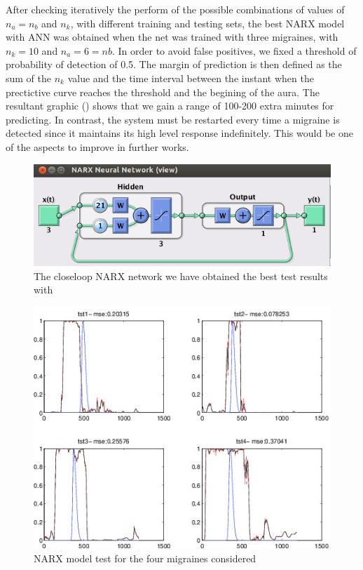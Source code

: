 After checking iteratively the perform  
of the possible combinations of values of 
$n_{a}=n_{b}$ and $n_{k}$, with different training and testing
sets, the best NARX model with ANN was obtained when the net was 
trained with three migraines, with $n_{k}=10$ and $n_{a}=6=n{b}$.
In order to avoid false positives, we fixed a threshold 
of probability of detection of 0.5. The margin of prediction is then 
defined as the sum of the $n_{k}$ value and the time interval 
between the instant when the prectictive curve reaches the threshold 
and the begining of the aura. The resultant graphic 
()
shows that we gain a range of 100-200 extra
minutes for predicting. In contrast, the system must be restarted
every time a migraine is detected since it maintains its high level 
response indefinitely. This would be one of the aspects to improve 
in further works.



\begin{figure}[!ht]
\centering
\includegraphics[width=0.9\columnwidth]{images/results/narxCloseloop}
\caption{The closeloop NARX network we have obtained the best test results with}
\label{fig:narxcloseloop}
\end{figure}




\begin{figure}
\centering
\includegraphics[width=\columnwidth]{images/results/narx_sinEDA_trn3_na-nb1-nk10_NN1}
\caption{NARX model test for the four migraines considered}
\label{fig:narxTest}
\end{figure}